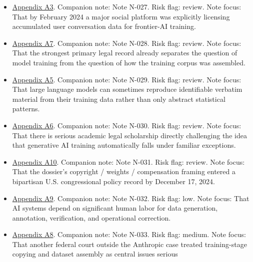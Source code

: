 \documentclass[
  american,
  11pt,
  letterpaper,
]{article}
\providecommand{\tightlist}{%
  \setlength{\itemsep}{0pt}\setlength{\parskip}{0pt}}
\begin{document}
\begin{itemize}
\tightlist
\item
  \hyperref[ch-04-appendix-a3-reddit-strikes-60m-deal-allowing-google-to-train-ai-models-on-its-posts-unveils-ipo-plans]{Appendix
  A3}. Companion note: Note N-027. Risk flag: review. Note focus: That
  by February 2024 a major social platform was explicitly licensing
  accumulated user conversation data for frontier-AI training.
\item
  \hyperref[ch-04-appendix-a7-bartz-et-al-v-anthropic-pbc-order-on-fair-use]{Appendix
  A7}. Companion note: Note N-028. Risk flag: review. Note focus: That
  the strongest primary legal record already separates the question of
  model training from the question of how the training corpus was
  assembled.
\item
  \hyperref[ch-04-appendix-a5-extracting-training-data-from-large-language-models]{Appendix
  A5}. Companion note: Note N-029. Risk flag: review. Note focus: That
  large language models can sometimes reproduce identifiable verbatim
  material from their training data rather than only abstract
  statistical patterns.
\item
  \hyperref[ch-04-appendix-a6-generative-ai-training-and-copyright-law]{Appendix
  A6}. Companion note: Note N-030. Risk flag: review. Note focus: That
  there is serious academic legal scholarship directly challenging the
  idea that generative AI training automatically falls under familiar
  exceptions.
\item
  \hyperref[ch-04-appendix-a10-bipartisan-house-task-force-report-on-artificial-intelligence]{Appendix
  A10}. Companion note: Note N-031. Risk flag: review. Note focus: That
  the dossier's copyright / weights / compensation framing entered a
  bipartisan U.S. congressional policy record by December 17, 2024.
\item
  \hyperref[ch-04-appendix-a9-the-problem-with-annotation-human-labour-and-outsourcing-between-france-and-madagascar]{Appendix
  A9}. Companion note: Note N-032. Risk flag: low. Note focus: That AI
  systems depend on significant human labor for data generation,
  annotation, verification, and operational correction.
\item
  \hyperref[ch-04-appendix-a8-the-new-york-times-company-v-microsoft-corporation-et-al-opinion-on-motions-to-dismiss]{Appendix
  A8}. Companion note: Note N-033. Risk flag: medium. Note focus: That
  another federal court outside the Anthropic case treated
  training-stage copying and dataset assembly as central issues serious

\end{itemize}
\end{document}
